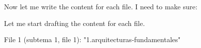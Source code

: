 Now let me write the content for each file. I need to make sure:

Let me start drafting the content for each file.

File 1 (subtema 1, file 1): "1.arquitecturas-fundamentales"
\lista{}
